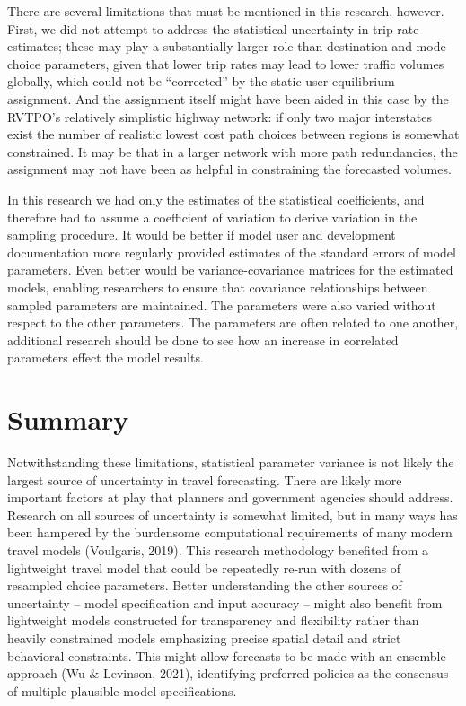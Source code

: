 \documentclass[fancy, masters,twoside]{byuthesis}
\begin{document}
There are several limitations that must be mentioned in this research, however. First, we did not attempt to address the statistical uncertainty in trip rate estimates; these may play a substantially larger role than destination and mode choice parameters, given that lower trip rates may lead to lower traffic volumes globally, which could not be ``corrected'' by the static user equilibrium assignment. And the assignment itself might have been aided in this case by the RVTPO's relatively simplistic highway network: if only two major interstates exist the number of realistic lowest cost path choices between regions is somewhat constrained. It may be that in a larger network with more path redundancies, the assignment may not have been as helpful in constraining the forecasted volumes.

In this research we had only the estimates of the statistical coefficients, and therefore had to assume a coefficient of variation to derive variation in the sampling procedure. It would be better if model user and development documentation more regularly provided estimates of the standard errors of model parameters. Even better would be variance-covariance matrices for the estimated models, enabling researchers to ensure that covariance relationships between sampled parameters are maintained. The parameters were also varied without respect to the other parameters. The parameters are often related to one another, additional research should be done to see how an increase in correlated parameters effect the model results.

\hypertarget{summary-3}{%
\section{Summary}\label{summary-3}}

Notwithstanding these limitations, statistical parameter variance is not likely the largest source of uncertainty in travel forecasting. There are likely more important factors at play that planners and government agencies should address. Research on all sources of uncertainty is somewhat limited, but in many ways has been hampered by the burdensome computational requirements of many modern travel models (Voulgaris, 2019). This research methodology benefited from a lightweight travel model that could be repeatedly re-run with dozens of resampled choice parameters. Better understanding the other sources of uncertainty -- model specification and input accuracy -- might also benefit from lightweight models constructed for transparency and flexibility rather than heavily constrained models emphasizing precise spatial detail and strict behavioral constraints. This might allow forecasts to be made with an ensemble approach (Wu \& Levinson, 2021), identifying preferred policies as the consensus of multiple plausible model specifications.
\end{document}
